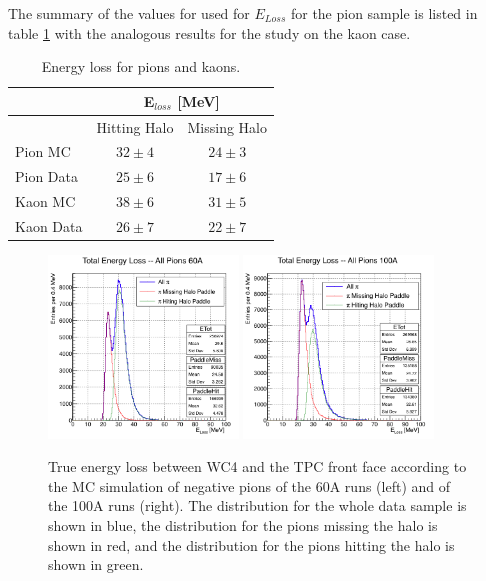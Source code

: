 The summary of the values for used for $E_{Loss}$ for the pion sample is listed in table \ref{tab:Eloss}  with the analogous results for the study on the kaon case.

\begin{table}[b]
\centering
\begin{tabular}{|l|c|c|}  
\hline
                          &  \multicolumn{2}{c|}{E$_{loss}$ [MeV]}    \\ \hline
                          & Hitting Halo          & Missing Halo     \\ \hline
Pion  MC           &  $32 \pm 4 $         &    $24 \pm 3$     \\ \hline
Pion Data          &  $25 \pm 6$          &    $17 \pm 6 $    \\ \hline
Kaon  MC          &  $38 \pm 6 $        &     $31 \pm 5 $    \\ \hline
Kaon Data         &  $26 \pm 7 $        &     $22 \pm 7 $    \\ \hline
\end{tabular}
\caption{Energy loss for pions and kaons.}
\label{tab:Eloss}
\end{table}





\begin{figure}[hbpt]
\centering
\includegraphics[width=0.45\textwidth]{Chapter-5/Images/E_loss60A.png}
\includegraphics[width=0.45\textwidth]{Chapter-5/Images/E_loss100A.png}
\caption{True energy loss between WC4 and the TPC front face according to the MC simulation of negative pions of the 60A runs (left) and of the 100A runs (right). The distribution for the whole data sample is shown in blue, the distribution for the pions missing the halo is shown in red, and the distribution for the pions hitting the halo is shown in green.  }
\label{fig:ELoss60A}
\end{figure}

